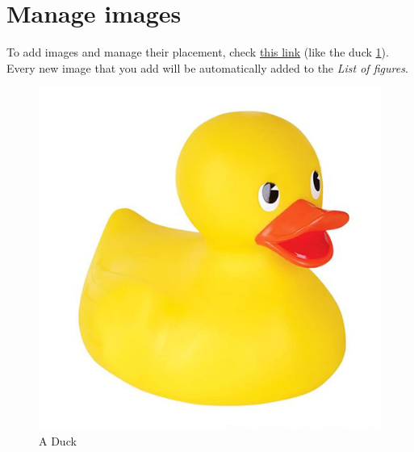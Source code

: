 \section{Manage images}\label{manage_images}
To add images and manage their placement, check \href{https://www.overleaf.com/learn/latex/Positioning_images_and_tables}{this link} (like the duck \ref{fig:duck}). Every new image that you add will be automatically added to the \textit{List of figures}. 

\begin{figure}[!ht]
    \centering
    \includegraphics[scale=0.1]{document/chapters/introduction/images/duck.jpeg}
    \caption{A Duck}
    \label{fig:duck}
\end{figure}